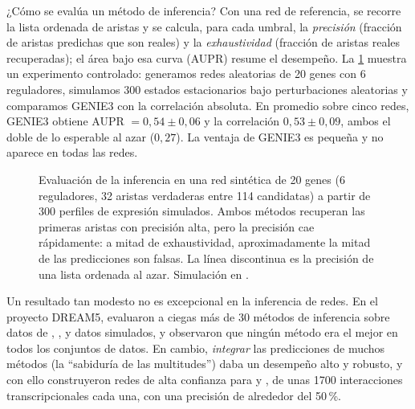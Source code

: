 ¿Cómo se evalúa un método de inferencia? Con una red de referencia, se recorre la lista ordenada de aristas y se calcula, para cada umbral, la \emph{precisión} (fracción de aristas predichas que son reales) y la \emph{exhaustividad} (fracción de aristas reales recuperadas); el área bajo esa curva (AUPR) resume el desempeño. La \cref{fig:16-pr} muestra un experimento controlado: generamos redes aleatorias de 20 genes con 6 reguladores, simulamos 300 estados estacionarios bajo perturbaciones aleatorias y comparamos GENIE3 con la correlación absoluta. En promedio sobre cinco redes, GENIE3 obtiene AUPR $=0{,}54\pm0{,}06$ y la correlación $0{,}53\pm0{,}09$, ambos el doble de lo esperable al azar ($0{,}27$). La ventaja de GENIE3 es pequeña y no aparece en todas las redes.

\begin{figure}[t]
\centering
{}
\caption[Curvas de precisión-exhaustividad]{Evaluación de la inferencia en una red sintética de 20 genes (6 reguladores, 32 aristas verdaderas entre 114 candidatas) a partir de 300 perfiles de expresión simulados. Ambos métodos recuperan las primeras aristas con precisión alta, pero la precisión cae rápidamente: a mitad de exhaustividad, aproximadamente la mitad de las predicciones son falsas. La línea discontinua es la precisión de una lista ordenada al azar. Simulación en .}
\label{fig:16-pr}
\end{figure}

Un resultado tan modesto no es excepcional en la inferencia de redes. En el proyecto DREAM5, \textcite{c16-marbach2012} evaluaron a ciegas más de 30 métodos de inferencia sobre datos de , ,  y datos simulados, y observaron que ningún método era el mejor en todos los conjuntos de datos. En cambio, \emph{integrar} las predicciones de muchos métodos (la ``sabiduría de las multitudes'') daba un desempeño alto y robusto, y con ello construyeron redes de alta confianza para  y , de unas \num{1700} interacciones transcripcionales cada una, con una precisión de alrededor del 50\,\%.

